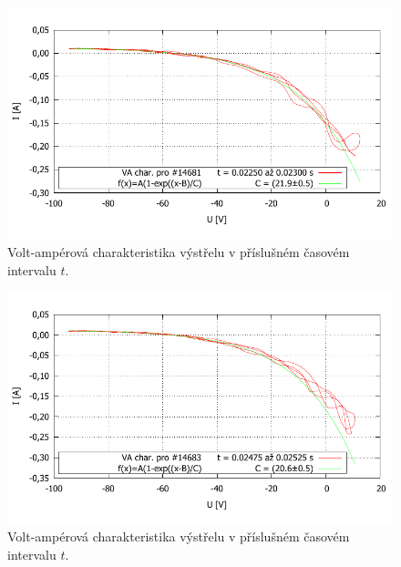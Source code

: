 \documentclass[english]{article}
\begin{document}
%
	\begin{figure}[h!]
	\begin{center}
	    \vspace*{-1cm}
		\includegraphics[width=\linewidth]{../gnuplot/VA_merge_14681.pdf}
	    \vspace*{-1,5cm}
		\caption{Volt-ampérová charakteristika výstřelu v příslušném časovém intervalu $t$. } 
		\label{fig:g_VA1}
	\end{center}
	\end{figure}	
%
	\begin{figure}[h!]
	\begin{center}
	    \vspace*{-1cm}
		\includegraphics[width=\linewidth]{../gnuplot/VA_merge_14683.pdf}
	    \vspace*{-1,5cm}
		\caption{Volt-ampérová charakteristika výstřelu v příslušném časovém intervalu $t$. } 
		\label{fig:g_VA2}
	\end{center}
	\end{figure}	
%
\end{document}
